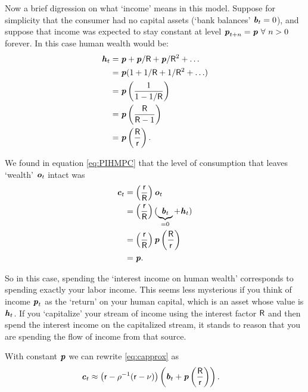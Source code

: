 \documentclass{scrartcl}
\begin{document}
Now a  brief digression on what `income' means in this model.
Suppose
for simplicity that the consumer had no capital assets (`bank balances' $\boldsymbol{\mathit{b}}_{t}=0$), and suppose
that income was expected to stay constant at level $\boldsymbol{\mathit{p}}_{t+n}=\boldsymbol{\mathit{p}}~\forall~n>0$ forever.
In this case human wealth would be:
\begin{equation*}
  \begin{gathered}
    \begin{aligned}
        \boldsymbol{\mathit{h}}_{t} & = \boldsymbol{\mathit{p}}+\boldsymbol{\mathit{p}}/\mathsf{R}+\boldsymbol{\mathit{p}}/\mathsf{R}^{2}+\ldots  \\
         & = \boldsymbol{\mathit{p}}(1+1/\mathsf{R}+1/\mathsf{R}^{2}+\ldots)  \\
         & = \boldsymbol{\mathit{p}}\left(\frac{1}{1-1/\mathsf{R}}\right)
\\   & = \boldsymbol{\mathit{p}}\left(\frac{\mathsf{R}}{\mathsf{R} -1}\right)
\\   & = \boldsymbol{\mathit{p}}\left(\frac{\mathsf{R}}{\mathsf{r}}\right)
.
\end{aligned}
\end{gathered}
\end{equation*}


We found in equation \eqref{eq:PIHMPC} that 
the level of consumption that leaves `wealth' $\boldsymbol{\mathit{o}}_{t}$ intact
was
\begin{equation}\begin{gathered}\begin{aligned}
        \boldsymbol{\mathit{c}}_{t} & =  \left(\frac{\mathsf{r}}{\mathsf{R}}\right) \boldsymbol{\mathit{o}}_{t}  \\
         & =  \left(\frac{\mathsf{r}}{\mathsf{R}}\right) (\underbrace{\boldsymbol{\mathit{b}}_{t}}_{=0}+\boldsymbol{\mathit{h}}_{t}) \\
                        & =  \left(\frac{\mathsf{r}}{\mathsf{R}}\right)     \boldsymbol{\mathit{p}} \left(\frac{\mathsf{R}}{\mathsf{r}}\right)\\
                        & =  \boldsymbol{\mathit{p}}.
\end{aligned}\end{gathered}\end{equation}

So in this case, spending the `interest income on human wealth' 
corresponds to spending exactly your labor income.
This seems less 
mysterious if you think of income $\boldsymbol{\mathit{p}}_{t}$ as the `return' on your 
human capital, which is an asset whose value is $\boldsymbol{\mathit{h}}_{t}$.
If you `capitalize' your stream of 
income using the interest factor $\mathsf{R}$ and then spend the interest income on the 
capitalized stream, it stands to reason that you are spending the flow 
of income from that source.

With constant $\boldsymbol{\mathit{p}}$ we can rewrite \eqref{eq:capprox} as
\begin{equation}\begin{gathered}\begin{aligned}
        \boldsymbol{\mathit{c}}_{t} & \approx  \left(\mathsf{r}-\rho^{-1}(\mathsf{r}-\nu)\right)\left(\boldsymbol{\mathit{b}}_{t}+ \boldsymbol{\mathit{p}}\left(\frac{\mathsf{R}}{\mathsf{r}}\right)\right).
\end{aligned}\end{gathered}\end{equation}
\end{document}
